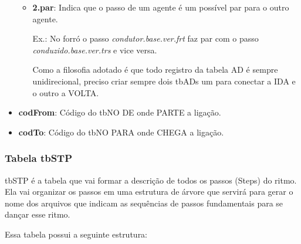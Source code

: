 \begin{itemize}
\begin{itemize}
				
				\item \textbf{2.par}: Indica que o passo de um agente é um possível par para o outro agente. 
				
				Ex.: No forró o passo \emph{condutor.base.ver.frt} faz par com o passo \emph{conduzido.base.ver.trs} e vice versa. 
				
				Como a filosofia adotado é que todo registro da tabela AD é sempre unidirecional, preciso criar sempre dois tbADs um para conectar a IDA e o outro a VOLTA.
			
			
			
			\end{itemize}

	\item \textbf{codFrom}: Código do tbNO DE onde PARTE a ligação.
	\item \textbf{codTo}: Código do tbNO PARA onde CHEGA a ligação.
	
\end{itemize}




\subsubsection{Tabela tbSTP}

tbSTP é a tabela que vai formar a descrição de todos os passos (Steps) do ritmo. Ela vai organizar os passos em uma estrutura de árvore que servirá para gerar o nome dos arquivos que indicam as sequências de passos fundamentais para se dançar esse ritmo.

Essa tabela possui a seguinte estrutura:

